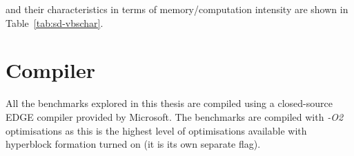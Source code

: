 and their characteristics in terms of memory/computation intensity are shown in Table~\ref{tab:sd-vbschar}.
\section{Compiler}\label{chp:setup:comp}

All the benchmarks explored in this thesis are compiled using a closed-source EDGE compiler provided by Microsoft.
The benchmarks are compiled with \textit{-O2} optimisations as this is the highest level of optimisations available with hyperblock formation turned on (it is its own separate flag).
